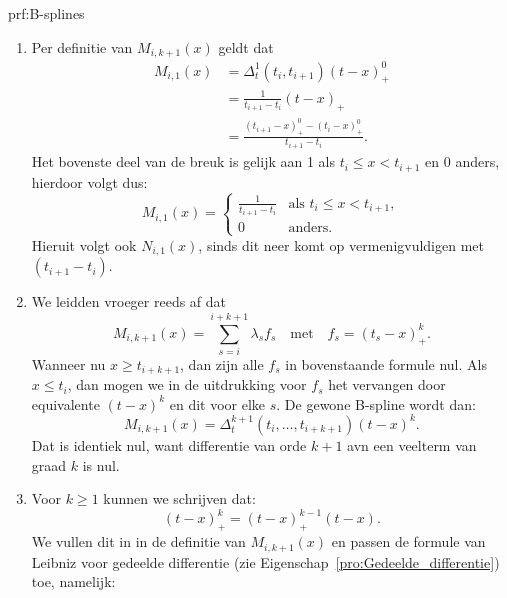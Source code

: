 \begin{prf}[B-splines]{prf:B-splines}
    \begin{enumerate}
        \item
            Per definitie van $M_{i,k+1}(x)$ geldt dat
            \begin{align*}
                M_{i,1}(x) 
                    &= \Delta_t^1(t_i,t_{i+1}) (t-x)^0_+ \\
                    &= \frac{1}{t_{i+1}-t_i} (t-x)_+ \\
                    &= \frac{(t_{i+1} - x)^0_+ - (t_i - x)^0_+}{t_{i+1}-t_i}.
            \end{align*} 
            Het bovenste deel van de breuk is gelijk aan 1 als $t_i \leq x < t_{i+1}$ en 0 anders, hierdoor volgt dus:
            \begin{equation*}
                M_{i,1}(x) = \begin{cases}
                    \frac{1}{t_{i+1}-t_i} & \text{als } t_i \leq x < t_{i+1}, \\
                    0 & \text{anders}.
                \end{cases}
            \end{equation*}
            Hieruit volgt ook $N_{i,1}(x)$, sinds dit neer komt op vermenigvuldigen met $(t_{i+1} - t_i)$.
        \item 
            We leidden vroeger reeds af dat 
            \begin{equation*}
                M_{i,k+1}(x) = \sum_{s=i}^{i+k+1} \lambda_s f_s \quad \text{met} \quad f_s = (t_s - x)^k_+.
            \end{equation*}
            Wanneer nu $x \geq t_{i+k+1}$, dan zijn alle $f_s$ in bovenstaande formule nul. Als $x \leq t_i$, dan mogen we in de uitdrukking voor $f_s$ het vervangen door equivalente $(t-x)^k$ en dit voor elke $s$. De gewone B-spline wordt dan:
            \begin{equation*}
                M_{i,k+1}(x) = \Delta_t^{k+1} (t_i,\ldots,t_{i+k+1}) (t-x)^k.
            \end{equation*}
            Dat is identiek nul, want differentie van orde $k+1$ avn een veelterm van graad $k$ is nul.
        \item 
            Voor $k \geq 1$ kunnen we schrijven dat:
            \begin{equation*}
                (t-x)^k_+ = (t-x)^{k-1}_+ (t-x).
            \end{equation*}
            We vullen dit in in de definitie van $M_{i,k+1}(x)$ en passen de formule van Leibniz voor gedeelde differentie  (zie Eigenschap~\ref{pro:Gedeelde_differentie}) toe, namelijk:

\end{enumerate}
\end{prf}
